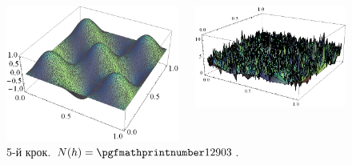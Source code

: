\begin{frame}[allowframebreaks]
		\begin{figure}[H]
			\begin{columns}
			 	\begin{column}{0.5\textwidth}
			 		\includegraphics[width=\textwidth]{problem1/my/solutions/5}
			 	 \end{column}
			     \begin{column}{0.5\textwidth}
			     	\includegraphics[width=\textwidth]{problem1/my/AEE/5}
			     \end{column}
		     \end{columns}
		     \caption*{5-й крок. $N(h) = \nn{12903}$.}
		\end{figure}

	\framebreak


\end{frame}
